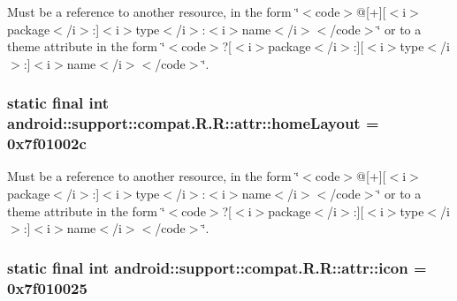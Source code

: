 Must be a reference to another resource, in the form \char`\"{}$<$code$>$@\mbox{[}+\mbox{]}\mbox{[}$<$i$>$package$<$/i$>$:\mbox{]}$<$i$>$type$<$/i$>$:$<$i$>$name$<$/i$>$$<$/code$>$\char`\"{} or to a theme attribute in the form \char`\"{}$<$code$>$?\mbox{[}$<$i$>$package$<$/i$>$:\mbox{]}\mbox{[}$<$i$>$type$<$/i$>$:\mbox{]}$<$i$>$name$<$/i$>$$<$/code$>$\char`\"{}. \hypertarget{classandroid_1_1support_1_1compat_1_1_r_1_1attr_b6b1887ed8f79746a4eb663472a7880c}{
\subsubsection[{homeLayout}]{\setlength{\rightskip}{0pt plus 5cm}static final int android::support::compat.R.R::attr::homeLayout = 0x7f01002c}}
\label{classandroid_1_1support_1_1compat_1_1_r_1_1attr_b6b1887ed8f79746a4eb663472a7880c}


Must be a reference to another resource, in the form \char`\"{}$<$code$>$@\mbox{[}+\mbox{]}\mbox{[}$<$i$>$package$<$/i$>$:\mbox{]}$<$i$>$type$<$/i$>$:$<$i$>$name$<$/i$>$$<$/code$>$\char`\"{} or to a theme attribute in the form \char`\"{}$<$code$>$?\mbox{[}$<$i$>$package$<$/i$>$:\mbox{]}\mbox{[}$<$i$>$type$<$/i$>$:\mbox{]}$<$i$>$name$<$/i$>$$<$/code$>$\char`\"{}. \hypertarget{classandroid_1_1support_1_1compat_1_1_r_1_1attr_aa77b42515ac3a2fdd4e131ef3bd7c6d}{
\subsubsection[{icon}]{\setlength{\rightskip}{0pt plus 5cm}static final int android::support::compat.R.R::attr::icon = 0x7f010025}}
\label{classandroid_1_1support_1_1compat_1_1_r_1_1attr_aa77b42515ac3a2fdd4e131ef3bd7c6d}


